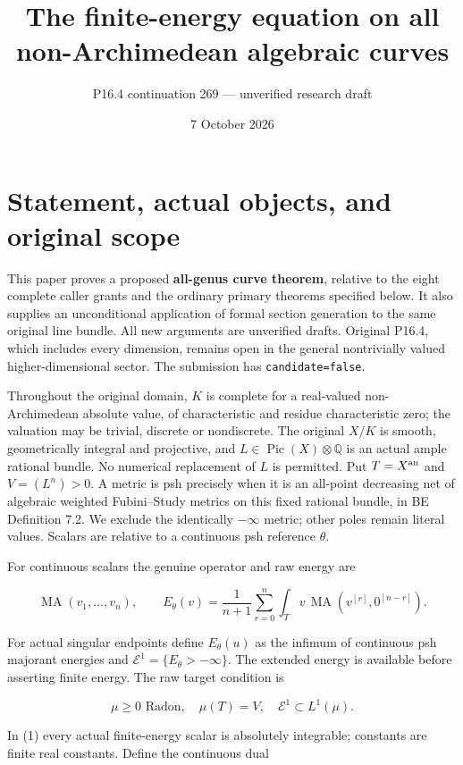 \documentclass[
  11pt,
]{article}
\title{The finite-energy equation on all non-Archimedean algebraic
curves}
\author{P16.4 continuation 269 --- unverified research draft}
\date{7 October 2026}
\begin{document}
\maketitle

\section{Statement, actual objects, and original
scope}\label{statement-actual-objects-and-original-scope}

This paper proves a proposed \textbf{all-genus curve theorem}, relative
to the eight complete caller grants and the ordinary primary theorems
specified below. It also supplies an unconditional application of formal
section generation to the same original line bundle. All new arguments
are unverified drafts. Original P16.4, which includes every dimension,
remains open in the general nontrivially valued higher-dimensional
sector. The submission has \texttt{candidate=false}.

Throughout the original domain, \(K\) is complete for a real-valued
non-Archimedean absolute value, of characteristic and residue
characteristic zero; the valuation may be trivial, discrete or
nondiscrete. The original \(X/K\) is smooth, geometrically integral and
projective, and \(L\in\operatorname{Pic}(X)\otimes\mathbb Q\) is an
actual ample rational bundle. No numerical replacement of \(L\) is
permitted. Put \(T=X^{\rm an}\) and \(V=(L^n)>0\). A metric is psh
precisely when it is an all-point decreasing net of algebraic weighted
Fubini--Study metrics on this fixed rational bundle, in BE Definition
7.2. We exclude the identically \(-\infty\) metric; other poles remain
literal values. Scalars are relative to a continuous psh reference
\(\theta\).

For continuous scalars the genuine operator and raw energy are

\[
 \operatorname{MA}(v_1,\ldots,v_n),\qquad
 E_\theta(v)=\frac1{n+1}\sum_{r=0}^n
 \int_T v\,\operatorname{MA}(v^{[r]},0^{[n-r]}).
\]

For actual singular endpoints define \(E_\theta(u)\) as the infimum of
continuous psh majorant energies and
\(\mathcal E^1=\{E_\theta>-\infty\}\). The extended energy is available
before asserting finite energy. The raw target condition is

\[
 \mu\geq0\text{ Radon},\quad \mu(T)=V,\quad
 \mathcal E^1\subset L^1(\mu).                                      \tag{1}
\]

In (1) every actual finite-energy scalar is absolutely integrable;
constants are finite real constants. Define the continuous dual
\end{document}
